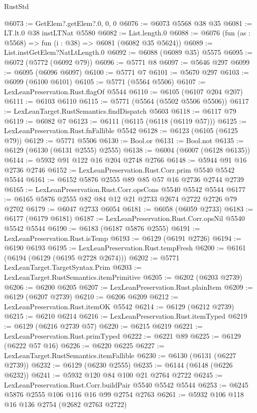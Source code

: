 \begin{lexlean}{RustStd}
\begin{coremodule}
{\begin{coremodule}
{{{{{{{{{{{{{{{{{{{{{{{{{{@6073 := GetElem?.getElem?.{0, 0, 0}
@6076 := @6073 @5568 @38 @35
@6081 := LT.lt.{0} @38 instLTNat @5580
@6082 := List.length.{0}
@6088 := @6076 (fun (as : @5568) => fun (i : @38) => @6081 (@6082 @35 @5624))
@6089 := List.instGetElem?NatLtLength.{0}
@6092 := @6088 (@6089 @35) @5575
@6095 := @6072 (@5772 (@6092 @79))
@6096 := @5771 @8
@6097 := @5646 @297
@6099 := @6095 (@6096 @6097)
@6100 := @5771 @7
@6101 := @5670 @297
@6103 := @6099 (@6100 @6101)
@6105 := @5771 (@5564 @5506)
@6107 := LexLeanPreservation.Rust.flagOf @5544
@6110 := @6105 (@6107 @204 @207)
@6111 := @6103 @6110
@6115 := @5771 (@5564 (@5502 @5506 @5506))
@6117 := LexLeanTarget.RustSemantics.findDispatch @5603
@6118 := @6117 @79
@6119 := @6082 @7
@6123 := @6111 (@6115 (@6118 (@6119 @57)))
@6125 := LexLeanPreservation.Rust.fnFallible @5542
@6128 := @6123 (@6105 (@6125 @79))
@6129 := @5771 @5506
@6130 := Bool.or
@6131 := Bool.not
@6135 := @6129 (@6130 (@6131 @2555) @2555)
@6138 := @6004 (@6007 (@6128 @6135))
@6144 := @5932 @91 @122 @16 @204 @2748 @2766
@6148 := @5944 @91 @16 @2736 @2746
@6152 := LexLeanPreservation.Rust.Corr.prim @5540 @5542 @5544
@6161 := @6152 @5876 @2555 @89 @85 @57 @16 @2736 @2744 @2739
@6165 := LexLeanPreservation.Rust.Corr.opsCons @5540 @5542 @5544
@6177 := @6165 @5876 @2555 @82 @84 @12 @21 @2733 @2674 @2722 @2726 @79 @2702
@6179 := @6047 @2733 @6054
@6181 := @6058 (@6059 @2733)
@6183 := @6177 (@6179 @6181)
@6187 := LexLeanPreservation.Rust.Corr.opsNil @5540 @5542 @5544
@6190 := @6183 (@6187 @5876 @2555)
@6191 := LexLeanPreservation.Rust.isTemp
@6193 := @6129 (@6191 @2726)
@6194 := @6190 @6193
@6195 := LexLeanPreservation.Rust.tempFresh
@6200 := @6161 (@6194 (@6129 (@6195 @2728 @2674)))
@6202 := @5771 LexLeanTarget.TargetSyntax.Prim
@6203 := LexLeanTarget.RustSemantics.itemPrimitive
@6205 := @6202 (@6203 @2739)
@6206 := @6200 @6205
@6207 := LexLeanPreservation.Rust.plainItem
@6209 := @6129 (@6207 @2739)
@6210 := @6206 @6209
@6212 := LexLeanPreservation.Rust.itemOK @5542
@6214 := @6129 (@6212 @2739)
@6215 := @6210 @6214
@6216 := LexLeanPreservation.Rust.itemTyped
@6219 := @6129 (@6216 @2739 @57)
@6220 := @6215 @6219
@6221 := LexLeanPreservation.Rust.primTyped
@6222 := @6221 @89
@6225 := @6129 (@6222 @57 @16)
@6226 := @6220 @6225
@6227 := LexLeanTarget.RustSemantics.itemFallible
@6230 := @6130 (@6131 (@6227 @2739))
@6232 := @6129 (@6230 @2555)
@6235 := @6144 (@6148 (@6226 @6232))
@6241 := @5932 @120 @84 @100 @21 @2764 @2722
@6245 := LexLeanPreservation.Rust.Corr.buildPair @5540 @5542 @5544
@6253 := @6245 @5876 @2555 @106 @116 @16 @99 @2754 @2763
@6261 := @5932 @106 @118 @16 @136 @2754 (@2682 @2763 @2722)
}}}}}}}}}}}}}}}}}}}}}}}}}}
\end{coremodule}}
\end{coremodule}
\end{lexlean}
